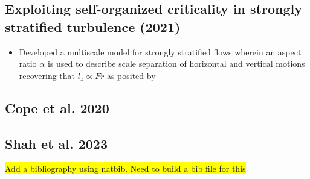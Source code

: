 \documentclass{article}
\begin{document}
\subsection{Exploiting self-organized criticality in strongly stratified
turbulence (2021)}
\begin{itemize}
    \item Developed a multiscale model for strongly stratified flows wherein an
    aspect ratio $\alpha$ is used to describe scale separation of horizontal and
    vertical motions recovering that $l_z \propto Fr$ as posited by
\end{itemize}

\subsection{Cope et al. 2020}

\subsection{Shah et al. 2023}

\colorbox{yellow}{Add a bibliography using natbib. Need to build a bib file for this}. 
\end{document}
